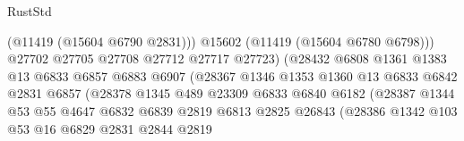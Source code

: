\begin{lexlean}{RustStd}
\begin{coremodule}
                                          (@11419 (@15604 @6790 @2831)))
                                        @15602
                                        (@11419 (@15604 @6780 @6798)))
                                      @27702
                                      @27705
                                      @27708
                                      @27712
                                      @27717
                                      @27723)
                                    (@28432
                                      @6808
                                      @1361
                                      @1383
                                      @13
                                      @6833
                                      @6857
                                      @6883
                                      @6907
                                      (@28367
                                        @1346
                                        @1353
                                        @1360
                                        @13
                                        @6833
                                        @6842
                                        @2831
                                        @6857
                                        (@28378
                                          @1345
                                          @489
                                          @23309
                                          @6833
                                          @6840
                                          @6182
                                          (@28387
                                            @1344
                                            @53
                                            @55
                                            @4647
                                            @6832
                                            @6839
                                            @2819
                                            @6813
                                            @2825
                                            @26843
                                            (@28386
                                              @1342
                                              @103
                                              @53
                                              @16
                                              @6829
                                              @2831
                                              @2844
                                              @2819

\end{coremodule}
\end{lexlean}
